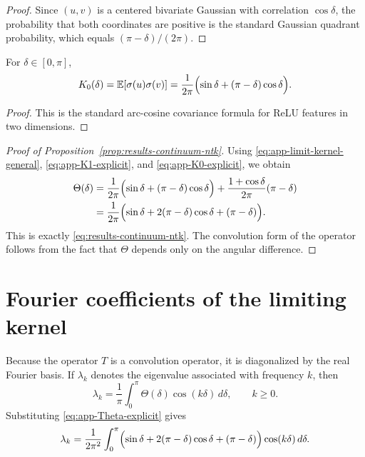 \begin{proof}
	Since \((u,v)\) is a centered bivariate Gaussian with correlation \(\cos\delta\), the
	probability that both coordinates are positive is the standard Gaussian quadrant probability,
	which equals \((\pi-\delta)/(2\pi)\).
\end{proof}

\begin{lemma}
	\label{lem:app-K0}
	For \(\delta\in[0,\pi]\),
	\begin{equation}
		K_0(\delta)=\mathbb E[\sigma(u)\sigma(v)]
		=
		\frac{1}{2\pi}\Bigl(\sin\delta+(\pi-\delta)\cos\delta\Bigr).
		\label{eq:app-K0-explicit}
	\end{equation}
\end{lemma}

\begin{proof}
	This is the standard arc-cosine covariance formula for ReLU features in two dimensions.
\end{proof}

\begin{proof}[Proof of Proposition~\ref{prop:results-continuum-ntk}]
	Using \eqref{eq:app-limit-kernel-general}, \eqref{eq:app-K1-explicit}, and
	\eqref{eq:app-K0-explicit}, we obtain
	\begin{align}
		\Theta(\delta)
		 & =
		\frac{1}{2\pi}\Bigl(\sin\delta+(\pi-\delta)\cos\delta\Bigr)
		+
		\frac{1+\cos\delta}{2\pi}(\pi-\delta) \notag \\
		 & =
		\frac{1}{2\pi}
		\Bigl(
		\sin\delta+2(\pi-\delta)\cos\delta+(\pi-\delta)
		\Bigr).
		\label{eq:app-Theta-explicit}
	\end{align}
	This is exactly \eqref{eq:results-continuum-ntk}. The convolution form of the operator
	follows from the fact that \(\Theta\) depends only on the angular difference.
\end{proof}

\section{Fourier coefficients of the limiting kernel}
\label{sec:app-fourier-coefficients}

Because the operator \(T\) is a convolution operator, it is diagonalized by the real Fourier
basis. If \(\lambda_k\) denotes the eigenvalue associated with frequency \(k\), then
\begin{equation}
	\lambda_k
	=
	\frac{1}{\pi}\int_0^\pi \Theta(\delta)\cos(k\delta)\,d\delta,
	\qquad
	k\ge 0.
	\label{eq:app-lambda-k}
\end{equation}
Substituting \eqref{eq:app-Theta-explicit} gives
\[
	\lambda_k
	=
	\frac{1}{2\pi^2}
	\int_0^\pi
	\Bigl(
	\sin\delta+2(\pi-\delta)\cos\delta+(\pi-\delta)
	\Bigr)\cos(k\delta)\,d\delta.
\]

